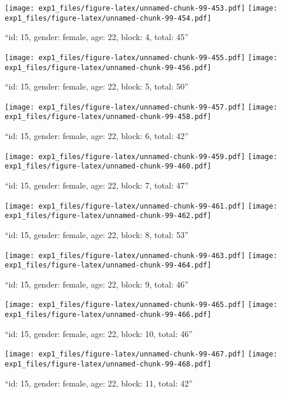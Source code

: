 \documentclass[,]{article}
\begin{document}
\texttt{[image: exp1\_files/figure-latex/unnamed-chunk-99-453.pdf]}
\texttt{[image: exp1\_files/figure-latex/unnamed-chunk-99-454.pdf]}

\newpage
[1] 

``id: 15, gender: female, age: 22, block: 4, total: 45''

\texttt{[image: exp1\_files/figure-latex/unnamed-chunk-99-455.pdf]}
\texttt{[image: exp1\_files/figure-latex/unnamed-chunk-99-456.pdf]}

\newpage
[1] 

``id: 15, gender: female, age: 22, block: 5, total: 50''

\texttt{[image: exp1\_files/figure-latex/unnamed-chunk-99-457.pdf]}
\texttt{[image: exp1\_files/figure-latex/unnamed-chunk-99-458.pdf]}

\newpage
[1] 

``id: 15, gender: female, age: 22, block: 6, total: 42''

\texttt{[image: exp1\_files/figure-latex/unnamed-chunk-99-459.pdf]}
\texttt{[image: exp1\_files/figure-latex/unnamed-chunk-99-460.pdf]}

\newpage
[1] 

``id: 15, gender: female, age: 22, block: 7, total: 47''

\texttt{[image: exp1\_files/figure-latex/unnamed-chunk-99-461.pdf]}
\texttt{[image: exp1\_files/figure-latex/unnamed-chunk-99-462.pdf]}

\newpage
[1] 

``id: 15, gender: female, age: 22, block: 8, total: 53''

\texttt{[image: exp1\_files/figure-latex/unnamed-chunk-99-463.pdf]}
\texttt{[image: exp1\_files/figure-latex/unnamed-chunk-99-464.pdf]}

\newpage
[1] 

``id: 15, gender: female, age: 22, block: 9, total: 46''

\texttt{[image: exp1\_files/figure-latex/unnamed-chunk-99-465.pdf]}
\texttt{[image: exp1\_files/figure-latex/unnamed-chunk-99-466.pdf]}

\newpage
[1] 

``id: 15, gender: female, age: 22, block: 10, total: 46''

\texttt{[image: exp1\_files/figure-latex/unnamed-chunk-99-467.pdf]}
\texttt{[image: exp1\_files/figure-latex/unnamed-chunk-99-468.pdf]}

\newpage
[1] 

``id: 15, gender: female, age: 22, block: 11, total: 42''
\end{document}

